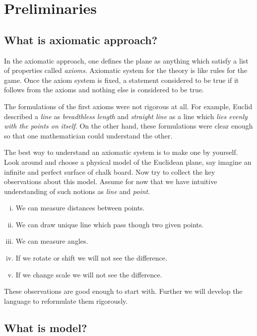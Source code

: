\chapter{Preliminaries}\label{chap:metr}

\section*{What is axiomatic approach?}

In the axiomatic approach,
one defines the plane as anything which satisfy 
a list of properties called {}\emph{axioms}.
Axiomatic system for the theory 
is like rules for the game.
Once the axiom system is fixed, a statement considered to be true if it follows from the axioms and nothing else is considered to be true.

The formulations of the first axioms were not rigorous at all.
For example, Euclid described a {}\emph{line} as {}\emph{breadthless length}
and {}\emph{straight line} as a line which {}\emph{lies evenly with the points on itself}.
On the other hand,
these formulations were clear enough so that one mathematician could understand the other.


The best way to understand an axiomatic system
is to make one by yourself.
Look around and choose a physical model 
of the Euclidean plane, 
say imagine an infinite and perfect surface of chalk board. 
Now try to collect the key observations
about this model.
Assume for now that we have intuitive understanding of such notions as {}\emph{line} and {}\emph{point}.
\begin{enumerate}[(i)]
 \item\label{preaxiomI} We can measure distances between points.
 \item\label{preaxiomII} We can draw unique line which pass though two given points.
 \item\label{preaxiomIII} We can measure angles.
 \item\label{preaxiomIV} If we rotate or shift we will not see the difference.
 \item\label{preaxiomV} If we change scale we will not see the difference.
\end{enumerate}
These observations are good enough to start with.
Further we will develop the language
to reformulate them rigorously.

\section*{What is model?}

